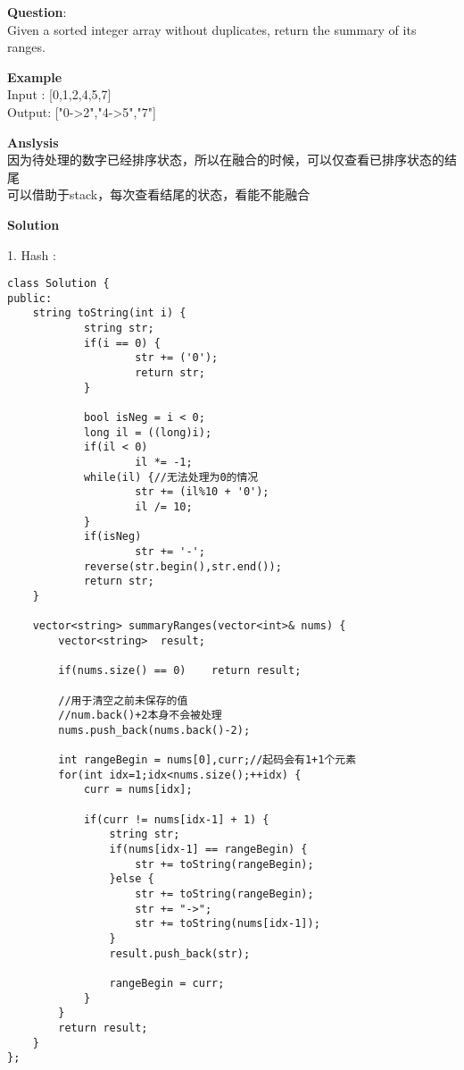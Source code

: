     
\begin{description}
    \item{\textbf{Question}}:\\%
		Given a sorted integer array without duplicates, return the summary of its ranges.\\

    \item{\textbf{Example}}\\
		Input : [0,1,2,4,5,7]\\
		Output: ["0->2","4->5","7"]\\

    \item{\textbf{Anslysis}}\\
		因为待处理的数字已经排序状态，所以在融合的时候，可以仅查看已排序状态的结尾\\
		可以借助于stack，每次查看结尾的状态，看能不能融合\\

    \item{\textbf{Solution}}\\
	\item{1. Hash} : \\
		\begin{lstlisting}
class Solution {
public:
	string toString(int i) {
			string str;
			if(i == 0) {
					str += ('0');
					return str;
			}

			bool isNeg = i < 0;
			long il = ((long)i);
			if(il < 0)
					il *= -1;
			while(il) {//无法处理为0的情况
					str += (il%10 + '0');
					il /= 10;
			}
			if(isNeg)
					str += '-';
			reverse(str.begin(),str.end());
			return str;
	}

    vector<string> summaryRanges(vector<int>& nums) {
	    vector<string>  result;

	    if(nums.size() == 0)	return result;

	    //用于清空之前未保存的值
	    //num.back()+2本身不会被处理
	    nums.push_back(nums.back()-2);

	    int rangeBegin = nums[0],curr;//起码会有1+1个元素
	    for(int idx=1;idx<nums.size();++idx) {
		    curr = nums[idx];

		    if(curr != nums[idx-1] + 1) {
			    string str;
			    if(nums[idx-1] == rangeBegin) {
				    str += toString(rangeBegin);
			    }else {
				    str += toString(rangeBegin);
				    str += "->";
				    str += toString(nums[idx-1]);
			    }
			    result.push_back(str);

			    rangeBegin = curr;
		    }
	    }
	    return result;
    }
};
		\end{lstlisting}

\end{description}

